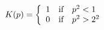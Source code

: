 \begin{equation}
K(p) = \left\{ \begin{array} {r@{\quad\text{if}\quad}l} 1 & p^2 <
1\\ 0 & p^2 > 2^2 \end{array} \right.
\end{equation}

